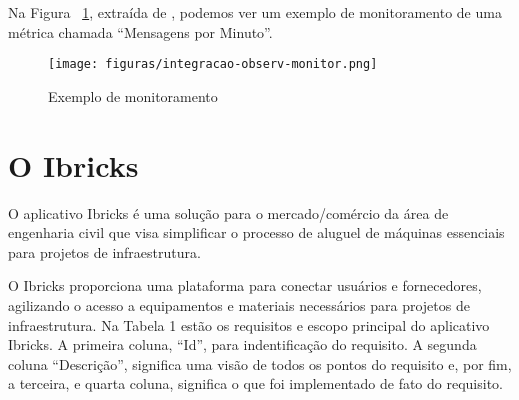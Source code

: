 \documentclass[12pt]{article}
\begin{document}
Na Figura ~\ref{fig:integracao}, extraída de \cite{lopes2023}, podemos ver um exemplo de monitoramento de uma métrica chamada “Mensagens por Minuto”.

\begin{figure}[!htb]
\centering
\texttt{[image: figuras/integracao-observ-monitor.png]}
\caption{Exemplo de monitoramento}
\label{fig:integracao}
\end{figure}


\section{O Ibricks} \label{sec:sobre} 

O aplicativo Ibricks é uma solução para o mercado/comércio da área de engenharia civil que visa simplificar o processo de aluguel de máquinas essenciais para projetos de infraestrutura.

O Ibricks proporciona uma plataforma para conectar usuários e fornecedores, agilizando o acesso a equipamentos e materiais necessários para projetos de infraestrutura. Na Tabela 1 estão os requisitos e escopo principal do aplicativo Ibricks. A primeira coluna, “Id”, para indentificação do requisito. A segunda coluna “Descrição”, significa uma visão de todos os pontos do requisito e, por fim, a terceira, e quarta coluna, significa o que foi implementado de fato do requisito.
\end{document}
